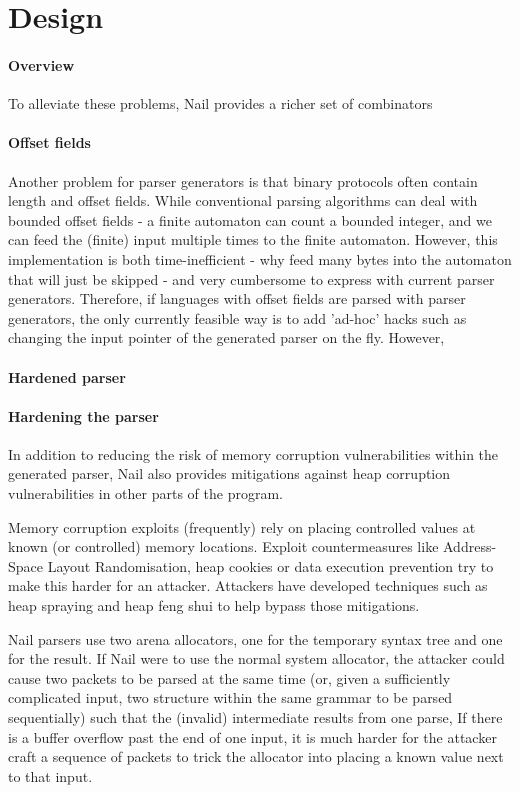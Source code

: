 \documentclass{article}
\begin{document}
\section{Design}

\paragraph{Overview}
To alleviate these problems, Nail provides a richer set of combinators
\paragraph{Offset fields}
Another problem for parser generators is that binary protocols often contain length and offset
fields. While conventional parsing algorithms can deal with bounded offset fields - a finite
automaton can count a bounded integer, and we can feed the (finite) input multiple times to the
finite automaton. However, this implementation is both time-inefficient - why feed many bytes into
the automaton that will just be skipped - and very cumbersome to express with current parser
generators. Therefore, if languages with offset fields are parsed with parser generators, the only
currently feasible way is to add 'ad-hoc' hacks such as changing the input pointer of the generated
parser on the fly. However, 
\paragraph{Hardened parser}

\paragraph{Hardening the parser}
In addition to reducing the risk of memory corruption vulnerabilities within the generated parser,
Nail also provides mitigations against heap corruption vulnerabilities in other parts of the
program.

Memory corruption exploits (frequently) rely on placing controlled values at known (or controlled)
memory locations. Exploit countermeasures  like Address-Space Layout Randomisation\cite{pax-aslr},
 heap cookies \cite{heapcookies} or data execution prevention try to make this harder for
 an attacker. Attackers have developed techniques such as heap spraying \cite{heapspray} and heap
 feng shui\cite{fengshui} to help bypass those mitigations. 


Nail parsers use two arena allocators\cite{arena}, one for the temporary syntax tree and one for the
result. If Nail were to use the normal system allocator, the attacker could cause two packets to be
parsed at the same time (or, given a sufficiently complicated input, two structure within the same
grammar to be parsed sequentially) such that the (invalid) intermediate results from one parse,  
 If there is a buffer overflow past the
end of one input, it is much harder for the attacker craft a sequence of packets to trick the allocator into
placing a known value next to that input.
\end{document}
